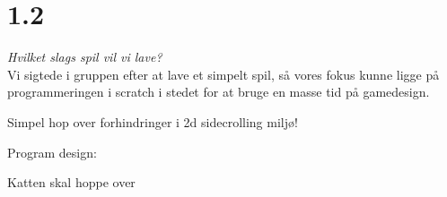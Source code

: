 \section{1.2}

\textit{Hvilket slags spil vil vi lave?}\\
Vi sigtede i gruppen efter at lave et simpelt spil, så vores fokus kunne ligge på programmeringen i scratch i stedet for at bruge en masse tid på gamedesign.

Simpel hop over forhindringer i 2d sidecrolling miljø!

Program design:

Katten skal hoppe over 


